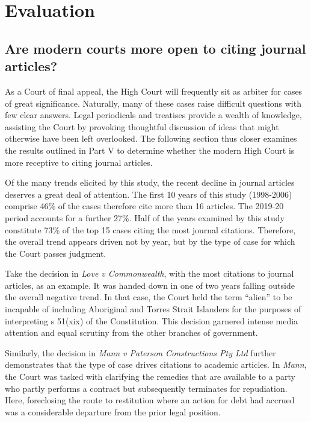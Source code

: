 \let\xn\xnote
\renewcommand\thesubsubsection{RQ\arabic{subsubsection}}

\newpage
\section{Evaluation}

\subsection{Are modern courts more open to citing journal articles?}

As a Court of final appeal, the High Court will frequently sit as arbiter for cases of great significance.\xn{6-1} Naturally, many of these cases raise difficult questions with few clear answers.\xn{6-2} Legal periodicals and treatises provide a wealth of knowledge, assisting the Court by provoking thoughtful discussion of ideas that might otherwise have been left overlooked. The following section thus closer examines the results outlined in Part V to determine whether the modern High Court is more receptive to citing journal articles.

Of the many trends elicited by this study, the recent decline in journal articles deserves a great deal of attention. The first 10 years of this study (1998-2006) comprise 46\% of the cases therefore cite more than 16 articles. The 2019-20 period accounts for a further 27\%. Half of the years examined by this study constitute 73\% of the top 15 cases citing the most journal citations. Therefore, the overall trend appears driven not by year, but by the type of case for which the Court passes judgment.

Take the decision in \emph{Love v Commonwealth}, with the most citations to journal articles, as an example.\xn{6-3} It was handed down in one of two years falling outside the overall negative trend. In that case, the Court held the term ``alien'' to be incapable of including Aboriginal and Torres Strait Islanders for the purposes of interpreting s 51(xix) of the Constitution.\xn{6-4} This decision garnered intense media attention and equal scrutiny from the other branches of government.\xn{6-5}

Similarly, the decision in \emph{Mann v Paterson Constructions Pty Ltd} further demonstrates that the type of case drives citations to academic articles.\xn{6-6} In \textit{Mann}, the Court was tasked with clarifying the remedies that are available to a party who partly performs a contract but subsequently terminates for repudiation.\xn{6-7} Here, foreclosing the route to restitution where an action for debt had accrued was a considerable departure from the prior legal position.\xn{6-8} 

